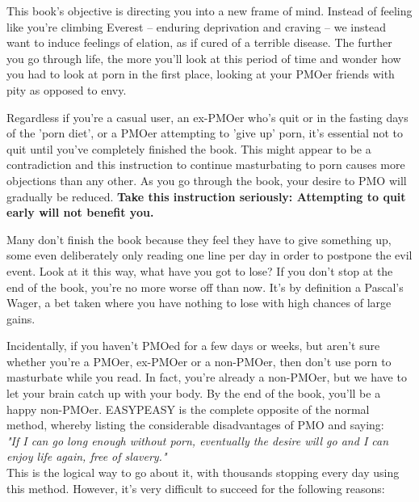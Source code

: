 \documentclass[easypeasy.tex]{subfiles}
\begin{document}
This book's objective is directing you into a new frame of mind. Instead of feeling like you're climbing Everest -- enduring deprivation and craving -- we instead want to induce feelings of elation, as if cured of a terrible disease. The further you go through life, the more you'll look at this period of time and wonder how you had to look at porn in the first place, looking at your PMOer friends with pity as opposed to envy.

Regardless if you're a casual user, an ex-PMOer who's quit or in the fasting days of the 'porn diet', or a PMOer attempting to 'give up' porn, it's essential not to quit until you've completely finished the book. This might appear to be a contradiction and this instruction to continue masturbating to porn causes more objections than any other. As you go through the book, your desire to PMO will gradually be reduced. \textbf{Take this instruction seriously: Attempting to quit early will not benefit you.}

Many don't finish the book because they feel they have to give something up, some even deliberately only reading one line per day in order to postpone the evil event. Look at it this way, what have you got to lose? If you don't stop at the end of the book, you're no more worse off than now. It's by definition a Pascal's Wager, a bet taken where you have nothing to lose with high chances of large gains.

Incidentally, if you haven't PMOed for a few days or weeks, but aren't sure whether you're a PMOer, ex-PMOer or a non-PMOer, then don't use porn to masturbate while you read. In fact, you're already a non-PMOer, but we have to let your brain catch up with your body. By the end of the book, you'll be a happy non-PMOer. EASYPEASY is the complete opposite of the normal method, whereby listing the considerable disadvantages of PMO and saying: \\
\textit{"If I can go long enough without porn, eventually the desire will go and I can enjoy life again, free of slavery."} \\
This is the logical way to go about it, with thousands stopping every day using this method. However, it's very difficult to succeed for the following reasons:
\end{document}
